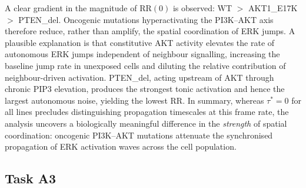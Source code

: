 \documentclass{article}
\begin{document}
A clear gradient in the magnitude of $\mathrm{RR}(0)$ is observed:
WT $>$ AKT1\_E17K $>$ PTEN\_del.
Oncogenic mutations hyperactivating the PI3K--AKT axis therefore reduce, rather
than amplify, the spatial coordination of ERK jumps.
A plausible explanation is that constitutive AKT activity elevates the rate of
autonomous ERK jumps independent of neighbour signalling, increasing the baseline
jump rate in unexposed cells and diluting the relative contribution of
neighbour-driven activation.
PTEN\_del, acting upstream of AKT through chronic PIP3 elevation, produces the
strongest tonic activation and hence the largest autonomous noise, yielding the
lowest $\mathrm{RR}$.
In summary, whereas $\tau^* = 0$ for all lines precludes distinguishing
propagation timescales at this frame rate, the analysis uncovers a biologically
meaningful difference in the \emph{strength} of spatial coordination: oncogenic
PI3K--AKT mutations attenuate the synchronised propagation of ERK activation waves
across the cell population.

\subsection{Task A3}
\end{document}
